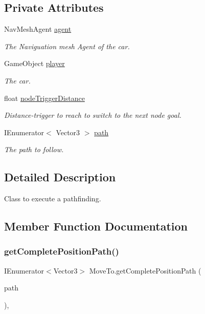 \subsection*{Private Attributes}
\begin{DoxyCompactItemize}
\item 
Nav\+Mesh\+Agent \hyperlink{classMoveTo_aff222c2a2538f0e0e496eaccb47b729c}{agent}
\begin{DoxyCompactList}\small\item\em The Naviguation mesh Agent of the car.\end{DoxyCompactList}\item 
Game\+Object \hyperlink{classMoveTo_aed2f4dbb8b9cbbc8a067f566faa89c6f}{player}
\begin{DoxyCompactList}\small\item\em The car.\end{DoxyCompactList}\item 
float \hyperlink{classMoveTo_ac75444070364c7dff21fb8be45488e40}{node\+Trigger\+Distance}
\begin{DoxyCompactList}\small\item\em Distance-\/trigger to reach to switch to the next node goal.\end{DoxyCompactList}\item 
I\+Enumerator$<$ Vector3 $>$ \hyperlink{classMoveTo_ac005c40e3b3058e444d5099ee11dcb32}{path}
\begin{DoxyCompactList}\small\item\em The path to follow.\end{DoxyCompactList}\end{DoxyCompactItemize}


\subsection{Detailed Description}
Class to execute a pathfinding. 



\subsection{Member Function Documentation}
\mbox{\label{classMoveTo_ab6dcd3455a240e67f54e89db046eedf9}} 
\subsubsection{\texorpdfstring{get\+Complete\+Position\+Path()}{getCompletePositionPath()}}
{\footnotesize\ttfamily I\+Enumerator$<$Vector3$>$ Move\+To.\+get\+Complete\+Position\+Path (\begin{DoxyParamCaption}\item[{List$<$ \hyperlink{classEdgeAntColonyData}{Edge\+Ant\+Colony\+Data} $>$}]{path }\end{DoxyParamCaption})\hspace{0.3cm}{\ttfamily [inline]}, {\ttfamily [private]}}





